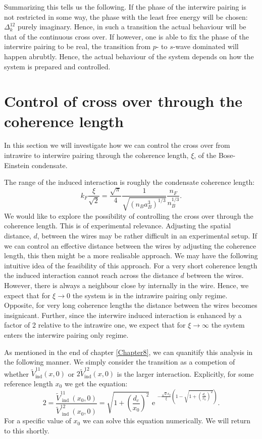 Summarizing this tells us the following. If the phase of the interwire pairing is not restricted in some way, the phase with the least free energy will be chosen: $\Delta^{12}_k$ purely imaginary. Hence, in such a transition the actual behaviour will be that of the continuous cross over. If however, one is able to fix the phase of the interwire pairing to be real, the transition from $p$- to $s$-wave dominated will happen abrubtly. Hence, the actual behaviour of the system depends on how the system is prepared and controlled.  


\section{Control of cross over through the coherence length}
\label{sec.2wires_crossover_control_coherence_length}
In this section we will investigate how we can control the cross over from intrawire to interwire pairing through the coherence length, $\xi$, of the Bose-Einstein condensate.

The range of the induced interaction is roughly the condensate coherence length:
\begin{equation}
k_F\frac{\xi}{\sqrt{2}} = \frac{\sqrt{\pi}}{4}\frac{1}{\sqrt{(n_Ba_B^3)^{1/3}}}\frac{n_F}{n_B^{1/3}}.
\label{eq.RangefunctionofrBBnB}
\end{equation}
We would like to explore the possibility of controlling the cross over through the coherence length. This is of experimental relevance. Adjusting the spatial distance, $d$, between the wires may be rather difficult in an experimental setup. If we can control an effective distance between the wires by adjusting the coherence length, this then might be a more realisable approach. We may have the following intuitive idea of the feasibility of this approach. For a very short coherence length the induced interaction cannot reach across the distance $d$ between the wires. However, there is always a neighbour close by internally in the wire. Hence, we expect that for $\xi \to 0$ the system is in the intrawire pairing only regime. Opposite, for very long coherence lengths the distance between the wires becomes insignicant. Further, since the interwire induced interaction is enhanced by a factor of 2 relative to the intrawire one, we expect that for $\xi \to \infty$ the system enters the interwire pairing only regime. 

As mentioned in the end of chapter \ref{Chapter8}, we can quanitify this analysis in the following manner. We simply consider the transition as a competion of whether $\tilde{V}^{11}_{\text{ind}}(x,0)$ or $2\tilde{V}^{12}_{\text{ind}}(x,0)$ is the larger interaction. Explicitly, for some reference length $x_0$ we get the equation:
\begin{equation}
2 = \frac{ \tilde{V}^{11}_{\text{ ind }}(x_0, 0) }{ \tilde{V}^{12}_{\text{ ind }}(x_0, 0) } = \sqrt{ 1 + \left( \frac{ d_c }{ x_0 } \right)^2 }\text{ e }^{ -\frac{ \sqrt{2}x_0 }{ \xi } \left( 1 - \sqrt{ 1 + \left( \frac{ d_c }{ x_0 } \right)^2 } \right) }.
\label{eq.2wires.Vequal}
\end{equation}
For a specific value of $x_0$ we can solve this equation numerically. We will return to this shortly.  


